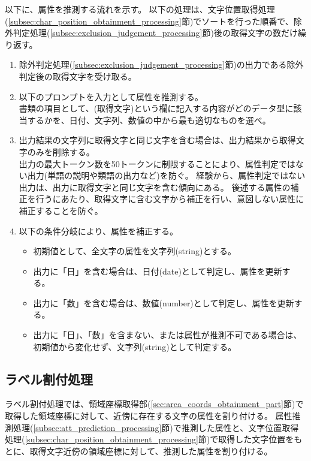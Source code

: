 以下に、属性を推測する流れを示す。
以下の処理は、文字位置取得処理(\ref{subsec:char_position_obtainment_processing}節)でソートを行った順番で、除外判定処理(\ref{subsec:exclusion_judgement_processing}節)後の取得文字の数だけ繰り返す。

\begin{enumerate}
    \item 除外判定処理(\ref{subsec:exclusion_judgement_processing}節)の出力である除外判定後の取得文字を受け取る。
    \item 以下のプロンプトを入力として属性を推測する。\\
        書類の項目として、(取得文字)という欄に記入する内容がどのデータ型に該当するかを、日付、文字列、数値の中から最も適切なものを選べ。
    \item 出力結果の文字列に取得文字と同じ文字を含む場合は、出力結果から取得文字のみを削除する。\\
        出力の最大トークン数を50トークンに制限することにより、属性判定ではない出力(単語の説明や類語の出力など)を防ぐ。
        経験から、属性判定ではない出力は、出力に取得文字と同じ文字を含む傾向にある。
        後述する属性の補正を行うにあたり、取得文字に含む文字から補正を行い、意図しない属性に補正することを防ぐ。
    \item 以下の条件分岐により、属性を補正する。
        \begin{itemize}
            \item 初期値として、全文字の属性を文字列(string)とする。
            \item 出力に「日」を含む場合は、日付(date)として判定し、属性を更新する。
            \item 出力に「数」を含む場合は、数値(number)として判定し、属性を更新する。
            \item 出力に「日」、「数」を含まない、または属性が推測不可である場合は、初期値から変化せず、文字列(string)として判定する。
        \end{itemize}
\end{enumerate}



\subsection{ラベル割付処理}\label{subsec:label_link_processing}
ラベル割付処理では、領域座標取得部(\ref{sec:area_coords_obtainment_part}節)で取得した領域座標に対して、近傍に存在する文字の属性を割り付ける。
属性推測処理(\ref{subsec:att_prediction_processing}節)で推測した属性と、文字位置取得処理(\ref{subsec:char_position_obtainment_processing}節)で取得した文字位置をもとに、取得文字近傍の領域座標に対して、推測した属性を割り付ける。


